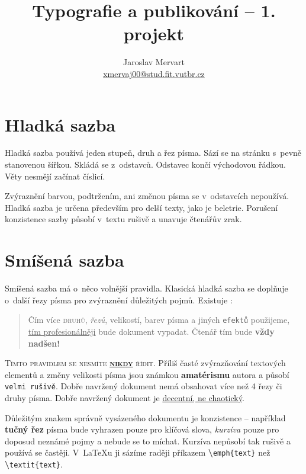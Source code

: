 \documentclass[twocolumn, 10pt]{article}[23.2.2024]
\title{Typografie a publikování -- 1. projekt}
\author{Jaroslav Mervart \\ \href{mailto:xmervaj00@stud.fit.vutbr.cz} {xmervaj00@stud.fit.vutbr.cz}}
\date{}
\begin{document}
\maketitle
\section {Hladká sazba}

Hladká sazba používá jeden stupeň, druh a řez písma.
Sází se na stránku s~pevně stanovenou šířkou.
Skládá se z~odstavců. Odstavec končí východovou řádkou.
Věty nesmějí začínat číslicí.\par

Zvýraznění barvou, podtržením, ani změnou písma se v~odstavcích nepoužívá.
Hladká sazba je určena především pro delší texty, jako je beletrie.
Porušení konzistence sazby působí v~textu rušivě a unavuje čtenářův zrak.\par

\section {Smíšená sazba}

Smíšená sazba má o~něco volnější pravidla.
Klasická hladká sazba se doplňuje o~další řezy písma pro zvýraznění důležitých pojmů.
Existuje :\par

\begin{quotation}
Čím více \textsc{druhů}, \textit{řezů}, {\scriptsize velikostí}, {\color{red} barev} písma a jiných \texttt{efektů} použijeme, \underline{tím profesionálněji} bude {\selectfont dokument} vypadat.
Čtenář tím bude \textbf{\LARGE vždy nadšen!}\par
\end{quotation}

\textsc{Tímto pravidlem se nesmíte \textbf{\underline{nikdy}} řídit.}
Příliš časté zvýrazňování textových elementů a změny {\tiny velikosti} písma jsou známkou \textbf{amatérismu} autora a působí \texttt{velmi rušivě}. Dobře navržený dokument nemá obsahovat více než 4 řezy či druhy písma. Dobře navržený dokument je \underline{decentní, ne chaotický}.\par
Důležitým znakem správně vysázeného dokumentu je konzistence -- například \textbf{tučný řez} písma bude vyhrazen pouze pro klíčová slova, \textit{kurzíva} pouze pro doposud neznámé pojmy a nebude se to míchat. Kurzíva nepůsobí tak rušivě a používá se častěji.
V~\LaTeX u ji sázíme raději příkazem \textbf{\textbackslash}\verb|emph{text}| než \textbf{\textbackslash}\verb|textit{text}|.\par
\end{document}
